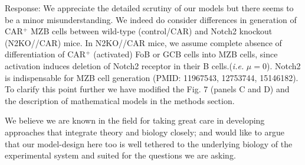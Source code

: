 \documentclass[11pt]{article}
\newcommand{\gray}[1]{{\color{gray}{#1}}}
\begin{document}
Response: We appreciate the detailed scrutiny of our models but there seems to be a minor misunderstanding.
We indeed do consider differences in generation of CAR$^{+}$ MZB cells between wild-type (control/CAR) and Notch2 knockout (N2KO//CAR) mice.
In N2KO//CAR mice, we assume complete absence of differentiation of CAR$^{+}$ (activated) FoB  or GCB cells into MZB cells, since activation induces deletion of Notch2 receptor in their B cells.(\textit{i.e.} $\mu=0$).
Notch2 is indispensable for MZB cell generation (PMID: 11967543, 12753744, 15146182).
To clarify this point further we have modified the Fig. 7 (panels C and D) and the description of mathematical models in the methods section.

We believe we are known in the field for taking great care in developing approaches that integrate theory and biology closely; and would like to argue that our model-design here too is well tethered to the underlying biology of the experimental system and suited for the questions we are asking. 

\gray{
3) In general, I believe that mathematical models should try to predict new features rather than just recapitulate existing data. Are there any new predictions for further experiments that the authors can propose, as this would increase the usefulness of the modeling section.
}
\end{document}
